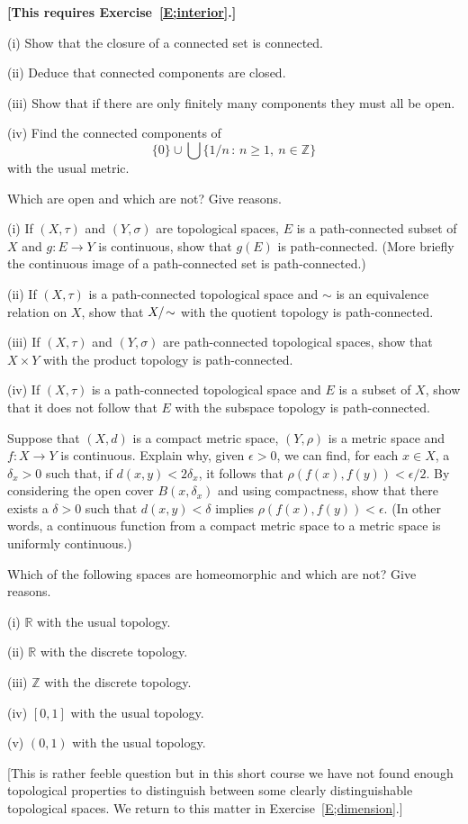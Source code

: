 \begin{exercise} {\bf [This requires Exercise~\ref{E;interior}.]}

(i) Show that the closure of a connected set is connected.

(ii) Deduce that connected components are closed.

(iii) Show that if there are only finitely many
components they must all be open.

(iv) Find the connected components of
\[\{0\}\cup\bigcup\{1/n\,:\,n\geq 1,\ n\in{\mathbb Z}\}\]
with the usual metric.

Which are open and which are not? Give reasons.
\end{exercise} 
\begin{exercise}\label{E;quotient path-connected}
(i) If $(X,\tau)$ and $(Y,\sigma)$ are topological spaces,
$E$ is a path-connected subset of $X$ and $g:E\rightarrow Y$
is continuous, show that $g(E)$ is path-connected.
(More briefly the continuous image of a path-connected
set is path-connected.)

(ii) If $(X,\tau)$ is a path-connected topological space
and $\sim$ is an equivalence relation on $X$, 
show that $X/\negthinspace\sim$
with the quotient topology is path-connected.

(iii) If $(X,\tau)$ and $(Y,\sigma)$ are 
path-connected topological spaces, show that $X\times Y$ 
with the product topology is path-connected.

(iv) If $(X,\tau)$ is a 
path-connected topological space and $E$ is a subset of $X$,
show that it does not follow that $E$ with the subspace 
topology is path-connected.
\end{exercise}
\begin{exercise}\label{E;uniform continuity} 
Suppose that $(X,d)$ is a compact metric space,
$(Y,\rho)$ is a metric space and $f:X\rightarrow Y$
is continuous. Explain why, given $\epsilon>0$,
we can find, for each $x\in X$, a $\delta_{x}>0$
such that, if $d(x,y)<2\delta_{x}$, it follows that
$\rho(f(x),f(y))<\epsilon/2$. By considering
the open cover $B(x,\delta_{x})$ and using compactness,
show that there exists a $\delta>0$ such that
$d(x,y)<\delta$ implies $\rho(f(x),f(y))<\epsilon$.
(In other words, a continuous function from a 
compact metric space to a metric space is uniformly continuous.)
\end{exercise}
\begin{exercise}\label{E;homeomorphic, non-homeomorphic}
Which of the following spaces are
homeomorphic and which are not? Give reasons.

(i) ${\mathbb R}$ with the usual topology.

(ii) ${\mathbb R}$ with the discrete topology.

(iii) ${\mathbb Z}$ with the discrete topology.

(iv) $[0,1]$ with the usual topology.

(v) $(0,1)$ with the usual topology.

[This is rather feeble question but in this short
course we have not found enough topological properties
to distinguish between some clearly distinguishable
topological spaces. We return to this matter
in Exercise~\ref{E;dimension}.]
\end{exercise}
